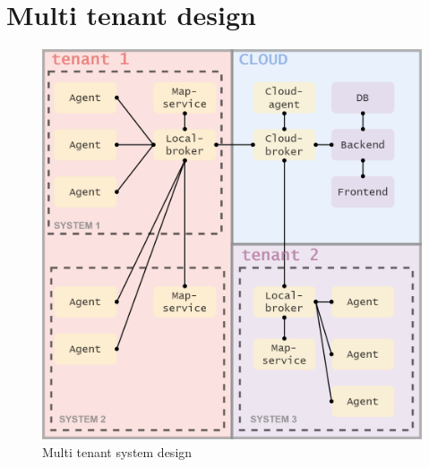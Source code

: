 \chapter{Multi tenant design}
\label{sec:app_03}

\begin{figure}[H]
    \centering
    \includegraphics[width=\textwidth]{pictures/multi_tenant_detailed.png}
    \caption{ Multi tenant system design }
    \label{fig:multi_tenant_detailed}
\end{figure}
